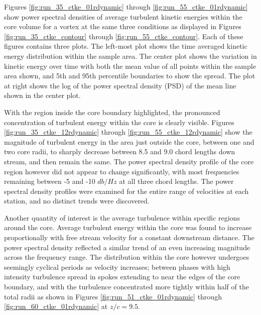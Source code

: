Figures \ref{fig:run_35_ctke_01rdynamic} through 
\ref{fig:run_55_ctke_01rdynamic} show power spectral densities of 
average turbulent kinetic energies within the core volume for a vortex at the 
same three conditions as displayed in Figures \ref{fig:run_35_ctke_contour} 
through \ref{fig:run_55_ctke_contour}. Each of these figures contains three 
plots. The left-most plot shows the time averaged kinetic energy distribution 
within the sample area. The center plot shows the variation in kinetic energy 
over time with both the mean value of all points within the sample area shown, 
and 5th and 95th percentile boundaries to show the spread. The plot at right 
shows the log of the power spectral density (PSD) of the mean line shown in the 
center plot. 





With the region inside the core boundary highlighted, the pronounced 
concentration of turbulent energy within the core is clearly visible. Figures 
\ref{fig:run_35_ctke_12rdynamic} through \ref{fig:run_55_ctke_12rdynamic} show 
the magnitude of turbulent energy in the area just outside the core, between 
one and two core radii, to sharply decrease between 8.5 and 9.0 chord lengths 
down stream, and then remain the same. The 
power spectral density profile of the core region however did not appear to 
change significantly, with most frequencies remaining between -5 and -10 
$db/Hz$ at all three chord lengths. The power spectral density profiles were 
examined for the entire range of velocities at each station, and no distinct 
trends were discovered.





Another quantity of interest is the average turbulence within specific regions 
around the core. Average turbulent energy within the core was found to increase 
proportionally with free stream velocity for a constant downstream distance. 
The power spectral density reflected 
a similar trend of an even increasing magnitude across the frequency range. The 
distribution within the core however undergoes seemingly cyclical periods as 
velocity increases; between phases with high intensity turbulence spread in 
spokes extending to near the edges of the core boundary, and with the 
turbulence concentrated more tightly within half of the total radii as shown in 
Figures \ref{fig:run_51_ctke_01rdynamic} through 
\ref{fig:run_60_ctke_01rdynamic} at $z/c = 9.5$.


